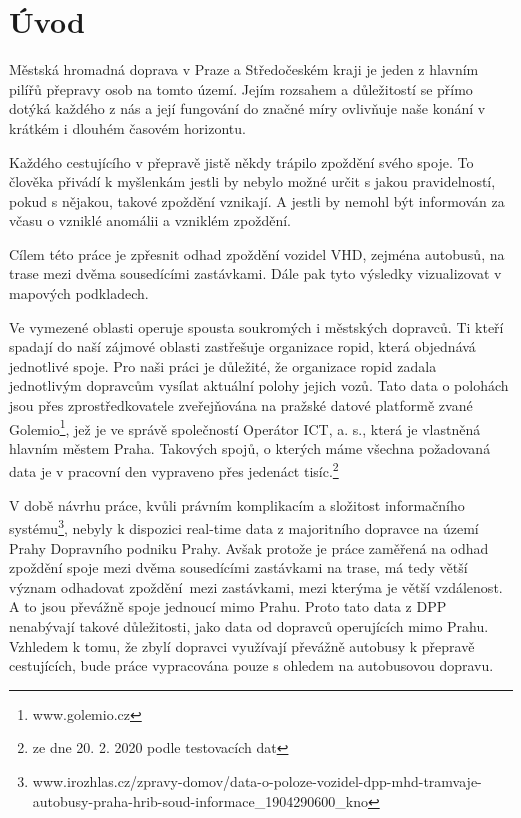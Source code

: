 \chapter*{Úvod}

Městská hromadná doprava v Praze a Středočeském kraji je jeden z hlavním pilířů přepravy osob na tomto území. Jejím rozsahem a důležitostí se přímo dotýká každého z nás a její fungování do značné míry ovlivňuje naše konání v krátkém i dlouhém časovém horizontu.

\bigbreak

Každého cestujícího v přepravě jistě někdy trápilo zpoždění svého spoje. To člověka přivádí k myšlenkám jestli by nebylo možné určit s jakou pravidelností, pokud s nějakou, takové zpoždění vznikají. A jestli by nemohl být informován za včasu o vzniklé anomálii a vzniklém zpoždění.

\bigbreak

Cílem této práce je zpřesnit odhad zpoždění vozidel VHD, zejména autobusů, na trase mezi dvěma sousedícími zastávkami. Dále pak tyto výsledky vizualizovat v mapových podkladech.

\bigbreak

Ve vymezené oblasti operuje spousta soukromých i městských dopravců. Ti kteří spadají do naší zájmové oblasti zastřešuje organizace \gls{ropid}, která objednává jednotlivé spoje. Pro naši práci je důležité, že organizace \gls{ropid} zadala jednotlivým dopravcům vysílat aktuální polohy jejich vozů. Tato data o polohách jsou přes zprostředkovatele zveřejňována na pražské datové platformě zvané Golemio\footnote{www.golemio.cz}, jež je ve správě společností Operátor ICT, a. s., která je vlastněná hlavním městem Praha.
Takových spojů, o kterých máme všechna požadovaná data je v pracovní den vypraveno přes jedenáct tisíc.\footnote{ze dne 20. 2. 2020 podle testovacích dat}

\bigbreak

V době návrhu práce, kvůli právním komplikacím a složitost informačního systému\footnote{www.irozhlas.cz/zpravy-domov/data-o-poloze-vozidel-dpp-mhd-tramvaje-autobusy-praha-hrib-soud-informace_1904290600_kno}, nebyly k dispozici real-time data z majoritního dopravce na území Prahy Dopravního podniku Prahy. Avšak protože je práce zaměřená na odhad zpoždění spoje mezi dvěma sousedícími zastávkami na trase, má tedy větší význam odhadovat zpoždění mezi zastávkami, mezi kterýma je větší vzdálenost. A to jsou převážně spoje jednoucí mimo Prahu. Proto tato data z DPP nenabývají takové důležitosti, jako data od dopravců operujících mimo Prahu. Vzhledem k tomu, že zbylí dopravci využívají převážně autobusy k přepravě cestujících, bude práce vypracována pouze s ohledem na autobusovou dopravu.

